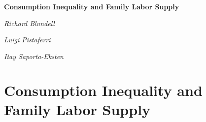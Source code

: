 \documentclass[notes=show]{beamer}
\begin{document}
\bigskip 

\begin{frame}%


\bigskip 

\begin{center}
\textbf{Consumption Inequality and Family Labor Supply}

\textit{Richard Blundell}

\textit{Luigi Pistaferri}

\textit{Itay Saporta-Eksten}
\end{center}

\bigskip 

\transboxout%
\end{frame}%

\section{Consumption Inequality and Family Labor Supply}
\end{document}

